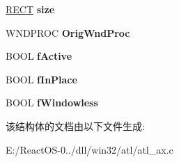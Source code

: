 \begin{DoxyCompactItemize}
\item 
\mbox{\label{struct_i_o_c_s_ab21108e7810ebfe64bbd1c599c9811c0}} 
\hyperlink{structtag_r_e_c_t}{R\+E\+CT} {\bfseries size}
\item 
\mbox{\label{struct_i_o_c_s_abc3a2920929c2e6688b1cb30b705b3ce}} 
W\+N\+D\+P\+R\+OC {\bfseries Orig\+Wnd\+Proc}
\item 
\mbox{\label{struct_i_o_c_s_a9ffa024264428474e11c70596430de41}} 
B\+O\+OL {\bfseries f\+Active}
\item 
\mbox{\label{struct_i_o_c_s_a91fc0050009bb46208d2fd03f2fa87c4}} 
B\+O\+OL {\bfseries f\+In\+Place}
\item 
\mbox{\label{struct_i_o_c_s_a8792d4d0f838920853cc1ddd4c9292dc}} 
B\+O\+OL {\bfseries f\+Windowless}
\end{DoxyCompactItemize}


该结构体的文档由以下文件生成\+:\begin{DoxyCompactItemize}
\item 
E\+:/\+React\+O\+S-\/0../dll/win32/atl/atl\+\_\+ax.\+c\end{DoxyCompactItemize}
